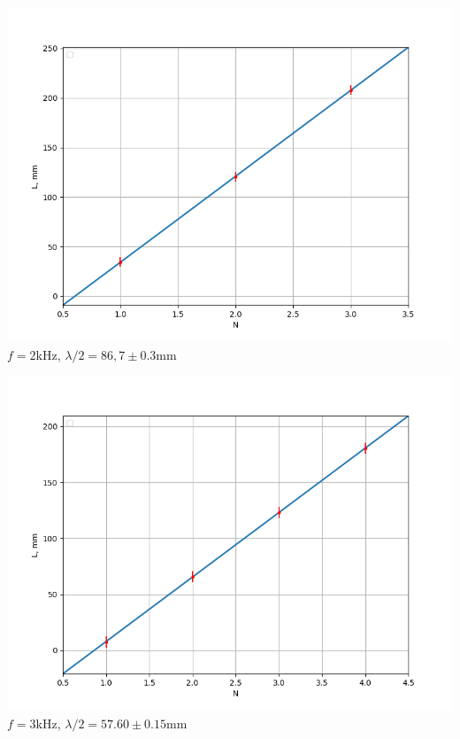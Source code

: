 \documentclass[12pt]{article}
\begin{document}
\begin{minipage}[t]{.49\textwidth}
	\vspace{0pt}
	\centering
		\includegraphics[scale = 0.45]{O2_2.png}
		\small{$f = 2$kHz, $\lambda/2 = 86,7\pm0.3$mm}
\end{minipage}
\begin{minipage}[t]{.49\textwidth}
	\vspace{0pt}
	\centering
	\includegraphics[scale = 0.45]{O2_3.png}
	\small{$f = 3$kHz, $\lambda/2 = 57.60\pm0.15$mm}
\end{minipage}
\end{document}
